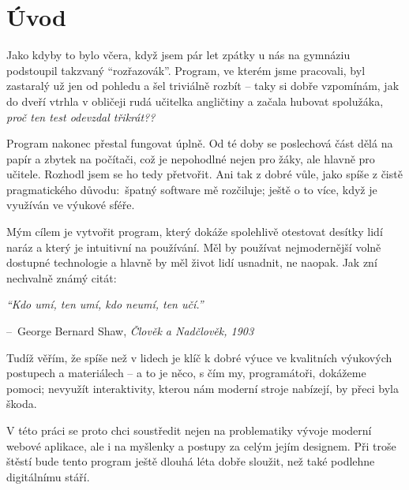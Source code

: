 \makeatletter
\renewcommand{\@chapapp}{}%
\newenvironment{chapquote}[2][2em]
  {\setlength{\@tempdima}{#1}%
   \def\chapquote@author{#2}%
   \parshape 1 \@tempdima \dimexpr\textwidth-2\@tempdima\relax%
   \itshape}
  {\par\normalfont\hfill--\ \chapquote@author\hspace*{\@tempdima}\par\bigskip}
\makeatother

\chapter*{Úvod}

Jako kdyby to bylo včera, když jsem pár let zpátky u nás na gymnáziu podstoupil takzvaný \enquote{rozřazovák}. Program, ve kterém jsme pracovali, byl zastaralý už jen od pohledu a šel triviálně rozbít -- taky si dobře vzpomínám, jak do dveří vtrhla v obličeji rudá učitelka angličtiny a začala hubovat spolužáka, \textit{proč ten test odevzdal třikrát??}

Program nakonec přestal fungovat úplně. Od té doby se poslechová část dělá na papír a zbytek na počítači, což je nepohodlné nejen pro žáky, ale hlavně pro učitele. Rozhodl jsem se ho tedy přetvořit. Ani tak z dobré vůle, jako spíše z čistě pragmatického důvodu:~špatný software mě rozčiluje; ještě o to více, když je využíván ve výukové sféře.

Mým cílem je vytvořit program, který dokáže spolehlivě otestovat desítky lidí naráz a který je intuitivní na používání. Měl by používat nejmodernější volně dostupné technologie a hlavně by měl život lidí usnadnit, ne naopak. Jak zní nechvalně známý citát:

\begin{chapquote}{George Bernard Shaw, \textit{Člověk a Nadčlověk, 1903}}
    \enquote{Kdo umí, ten umí, kdo neumí, ten učí.}
\end{chapquote}

Tudíž věřím, že spíše než v lidech je klíč k dobré výuce ve kvalitních výukových postupech a materiálech -- a to je něco, s čím my, programátoři, dokážeme pomoci; nevyužít interaktivity, kterou nám moderní stroje nabízejí, by přeci byla škoda.

V této práci se proto chci soustředit nejen na problematiky vývoje moderní webové aplikace, ale i na myšlenky a postupy za celým jejím designem. Při troše štěstí bude tento program ještě dlouhá léta dobře sloužit, než také podlehne digitálnímu stáří.